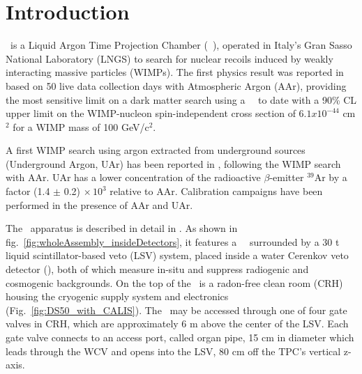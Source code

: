 \section{Introduction}\label{sec:intro}\label{sec:introduction}


\dsf\ is a Liquid Argon Time Projection Chamber (\lar\ \tpc), operated in Italy's Gran Sasso National Laboratory (LNGS) to search for nuclear recoils induced by weakly interacting massive particles (WIMPs). The first physics result was reported in \cite{Agnes:2015gu} based on 50 live data collection days with Atmospheric Argon (AAr), providing the most sensitive limit on a dark matter search using a \lar\ \tpc\ to date with a 90\% CL upper limit on the WIMP-nucleon spin-independent cross section of $6.1 x 10^{-44}$ cm$^2$ for a WIMP mass of 100 GeV/c$^2$.  %

A first WIMP search using argon extracted from underground sources (Underground Argon, UAr) has been reported in \cite{Agnes:2015_uar}, following the WIMP search with AAr. UAr has a lower concentration of the radioactive $\beta$-emitter $^{39}$Ar by a factor (1.4 $\pm$ 0.2) $\times\, 10^3$ relative to AAr. Calibration campaigns have been performed in the presence of AAr and UAr.

The \dsf\ apparatus is described in detail in \cite{Agnes:2015gu}. As shown in fig.~\ref{fig:wholeAssembly_insideDetectors}, it features a \lar\ \tpc\ surrounded by a 30 t liquid scintillator-based veto (LSV) system, placed inside a water Cerenkov veto detector (\wcv), both of which measure in-situ and suppress radiogenic and cosmogenic backgrounds. On the top of the \wcv\ is a radon-free clean room (CRH) housing the cryogenic supply system and electronics (Fig.~\ref{fig:DS50_with_CALIS}). The \lsv\ may be accessed through one of four gate valves in CRH, which are approximately 6 m above the center of the LSV. Each gate valve connects to an access port, called organ pipe, 15 cm in diameter which leads through the WCV and opens into the LSV, 80 cm off the TPC's vertical z-axis.


